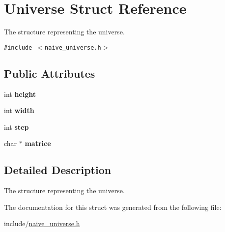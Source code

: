 \hypertarget{structUniverse}{
\section{Universe Struct Reference}
\label{structUniverse}
}
The structure representing the universe.  


{\tt \#include $<$naive\_\-universe.h$>$}

\subsection*{Public Attributes}
\begin{CompactItemize}
\item 
\hypertarget{structUniverse_f5de06e28eba4408fb28f4503fe47bbd}{
int \textbf{height}}
\label{structUniverse_f5de06e28eba4408fb28f4503fe47bbd}

\item 
\hypertarget{structUniverse_09496fb9152cf1ae4048a77345cbd80f}{
int \textbf{width}}
\label{structUniverse_09496fb9152cf1ae4048a77345cbd80f}

\item 
\hypertarget{structUniverse_a310b1331433a118588244e00cd005c5}{
int \textbf{step}}
\label{structUniverse_a310b1331433a118588244e00cd005c5}

\item 
\hypertarget{structUniverse_c683c16c2698f8ab9bdc3f3c564fd3be}{
char $\ast$ \textbf{matrice}}
\label{structUniverse_c683c16c2698f8ab9bdc3f3c564fd3be}

\end{CompactItemize}


\subsection{Detailed Description}
The structure representing the universe. 

The documentation for this struct was generated from the following file:\begin{CompactItemize}
\item 
include/\hyperlink{naive__universe_8h}{naive\_\-universe.h}\end{CompactItemize}
